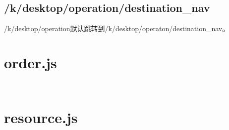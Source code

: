 \begin{lstlisting}[language=bash]

\end{lstlisting}

\subsection{/k/desktop/operation/destination\_nav}


/k/desktop/operation默认跳转到/k/desktop/operaton/destination\_nav。



\section{order.js}


\begin{lstlisting}[language=bash]

\end{lstlisting}



\begin{lstlisting}[language=bash]

\end{lstlisting}


\section{resource.js}



